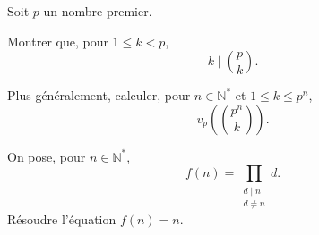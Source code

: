 \documentclass[11pt,a4paper]{article}
\begin{document}
\begin{exercise}
Soit $p$ un nombre premier.
\begin{questions}
    \item Montrer que, pour $1\le k<p$,
    \[
        k\mid\binom{p}{k}.
    \]
    \item Plus généralement, calculer, pour
    $n\in\mathbb{N}^*$ et $1\le k\le p^n$,
    \[
        v_p\left(\binom{p^n}{k}\right).
    \]
\end{questions}
\end{exercise}

\begin{exercise}
On pose, pour $n\in\mathbb{N}^*$,
\[
    f(n)=\prod_{\substack{d\mid n\\d\ne n}}d.
\]
Résoudre l'équation $f(n)=n$.
\end{exercise}
\end{document}
